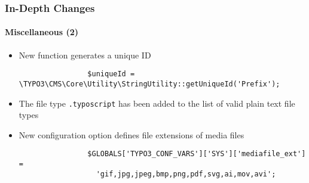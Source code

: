 \begin{frame}[fragile]
	\frametitle{In-Depth Changes}
	\framesubtitle{Miscellaneous (2)}


	\begin{itemize}

		\item New function generates a unique ID

			\begin{lstlisting}
				$uniqueId = \TYPO3\CMS\Core\Utility\StringUtility::getUniqueId('Prefix');
			\end{lstlisting}

		\item The file type \texttt{.typoscript} has been added to the list of valid plain text file types

		\item New configuration option defines file extensions of media files

			\begin{lstlisting}
				$GLOBALS['TYPO3_CONF_VARS']['SYS']['mediafile_ext'] =
				  'gif,jpg,jpeg,bmp,png,pdf,svg,ai,mov,avi';
			\end{lstlisting}

	\end{itemize}

	\breakingchange

\end{frame}

